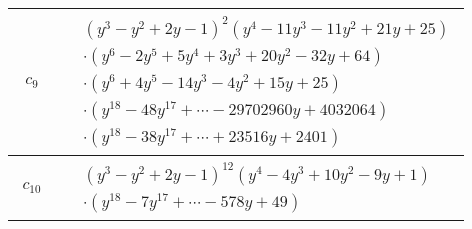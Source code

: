 \documentclass[1p]{elsarticle_modified}
\theoremstyle{definition}
\begin{document}
\begin{tabular}{m{50pt}|m{274pt}}
\hline $$\begin{aligned}c_{9}\end{aligned}$$&$\begin{aligned}
&(y^3- y^2+2 y-1)^2(y^4-11 y^3-11 y^2+21 y+25)\\
&\cdot(y^6-2 y^5+5 y^4+3 y^3+20 y^2-32 y+64)\\
&\cdot(y^6+4 y^5-14 y^3-4 y^2+15 y+25)\\
&\cdot(y^{18}-48 y^{17}+\cdots-29702960 y+4032064)\\
&\cdot(y^{18}-38 y^{17}+\cdots+23516 y+2401)
\end{aligned}$\\
\hline $$\begin{aligned}c_{10}\end{aligned}$$&$\begin{aligned}
&(y^3- y^2+2 y-1)^{12}(y^4-4 y^3+10 y^2-9 y+1)\\
&\cdot(y^{18}-7 y^{17}+\cdots-578 y+49)
\end{aligned}$\\
\hline
\end{tabular}
\vskip 2pc
\end{document}
